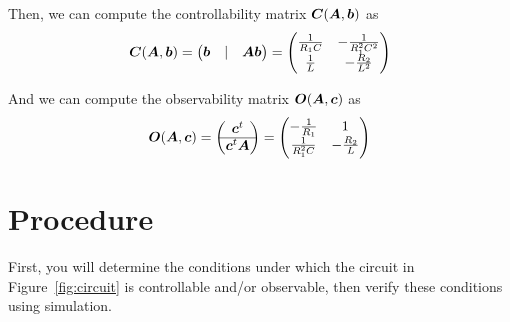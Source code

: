 Then, we can compute the controllability matrix \( \boldsymbol{C}(\boldsymbol{A},\boldsymbol{b}) \) as
\begin{equation}\label{eq:controlmatrix} \boldsymbol{C}(\boldsymbol{A}, \boldsymbol{b}) = \begin{pmatrix}
        \boldsymbol{b} & | & \boldsymbol{Ab}
    \end{pmatrix} = \begin{pmatrix}
        \frac{1}{R_1C} & -\frac{1}{R_1^2C^2} \\
        \frac{1}{L}    & -\frac{R_2}{L^2}
    \end{pmatrix}\end{equation}

And we can compute the observability matrix \( \boldsymbol{O}(\boldsymbol{A},\boldsymbol{c}) \) as
\begin{equation}\label{eq:observematrix} \boldsymbol{O}(\boldsymbol{A}, \boldsymbol{c}) = \begin{pmatrix}
        \boldsymbol{c}^t \\ \hline
        \boldsymbol{c}^t \boldsymbol{A}
    \end{pmatrix} = \begin{pmatrix}
        -\frac{1}{R_1}   & 1              \\
        \frac{1}{R_1^2C} & -\frac{R_2}{L}
    \end{pmatrix}\end{equation}

\section{Procedure}

First, you will determine the conditions under which the circuit in Figure~\ref{fig:circuit} is controllable and/or observable, then verify these conditions using simulation.

